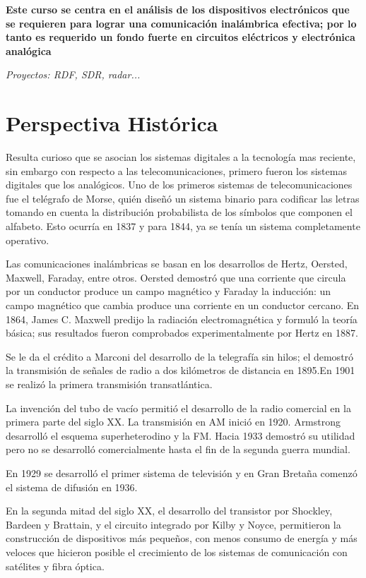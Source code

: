 \documentclass[12pt,letterpaper,titlepage,twoside]{book}
\begin{document}
\textbf{Este curso se centra en el análisis de los dispositivos electrónicos que se requieren para lograr una comunicación inalámbrica efectiva; por lo tanto es requerido un fondo fuerte en circuitos eléctricos y electrónica analógica}

\emph{Proyectos: RDF, SDR, radar...}
  
\section{Perspectiva Histórica}

Resulta curioso que se asocian los sistemas digitales a la tecnología mas reciente, sin embargo con respecto a las telecomunicaciones, primero fueron los sistemas digitales que los analógicos. Uno de los primeros sistemas de telecomunicaciones fue el telégrafo de Morse, quién diseñó un sistema binario para codificar las letras tomando en cuenta la distribución probabilista de los símbolos que componen el alfabeto. Esto ocurría en 1837 y para 1844, ya se tenía un sistema completamente operativo.

Las comunicaciones inalámbricas se basan en los desarrollos de Hertz, Oersted, Maxwell, Faraday, entre otros. Oersted demostró que una corriente que circula por un conductor produce un campo magnético y Faraday la inducción: un campo magnético que cambia produce una corriente en un conductor cercano. En 1864, James C. Maxwell predijo la radiación electromagnética y formuló la teoría básica; sus resultados fueron comprobados experimentalmente por Hertz en 1887.

Se le da el crédito a Marconi del desarrollo de la telegrafía sin hilos; el demostró la transmisión de señales de radio a dos kilómetros de distancia en 1895.En 1901 se realizó la primera transmisión transatlántica.

La invención del tubo de vacío permitió el desarrollo de la radio comercial en la primera parte del siglo XX. La transmisión en AM inició en 1920. Armstrong desarrolló el esquema superheterodino y la FM. Hacia 1933 demostró su utilidad pero no se desarrolló comercialmente hasta el fin de la segunda guerra mundial.

En 1929  se desarrolló el primer sistema de televisión y en Gran Bretaña comenzó el sistema de difusión en 1936. 

En la segunda mitad del siglo XX, el desarrollo del transistor por Shockley, Bardeen y Brattain, y el circuito integrado por Kilby	y Noyce, permitieron la construcción de dispositivos más pequeños, con menos consumo de energía y más veloces que hicieron posible el crecimiento de los sistemas de comunicación con satélites y fibra óptica.
\end{document}
